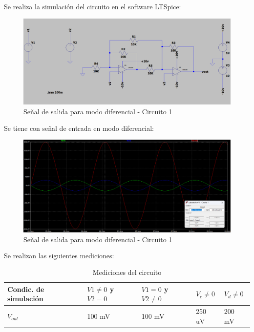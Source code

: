 Se realiza la simulación del circuito en el software LTSpice:

\begin{figure}[h]
    \centering
    \includegraphics[width=1\linewidth]{Secciones/Circuito1/circuito1_simulacion.png}
    \caption{Señal de salida para modo diferencial - Circuito 1}
    \label{fig:Circuito1Simulacion}
\end{figure}

\hspace{1mm} Se tiene con señal de entrada en modo diferencial:

\begin{figure}[h!]
    \centering
    \includegraphics[width=1\linewidth]{Secciones/Circuito1/circuito1_diferencial.png}
    
    \caption{Señal de salida para modo diferencial - Circuito 1}
    \label{fig:Circuito1Diferencial}
\end{figure}

Se realizan las siguientes mediciones:

    

\begin{table}[H]
\centering
\begin{tabular}{ | m{2cm} | m{2cm}| m{2cm} | m{2cm} | m{2cm} | } 
  \hline
  Condic. de simulación & $V1 \neq 0$ y $V2 = 0$ & $V1 = 0$ y $V2 \neq 0$ & $V_c \neq 0$ & $V_d \neq 0$ \\ 
  \hline
  $V_{out}$ & 100 mV & 100 mV & 250 uV & 200 mV \\ 
  \hline
\end{tabular}
\caption{Mediciones del circuito}
\end{table}

